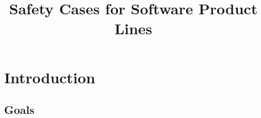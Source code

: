 \documentclass[11pt]{article}
\title{Safety Cases for Software Product Lines}
\date{}                                           %
\begin{document}
\maketitle
%
%
\section{Introduction}
%
%
%
%
\subsection{Goals}
%
\end{document}
